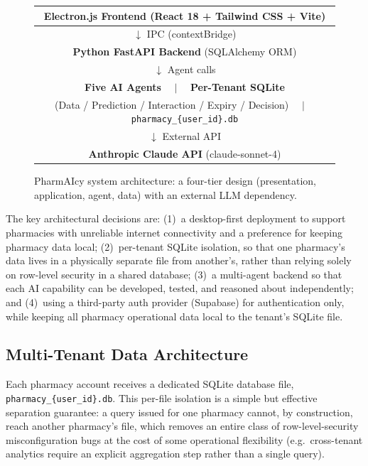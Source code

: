 \documentclass[12pt,a4paper]{article}
\begin{document}
\begin{figure}[H]
\centering
\begin{tabular}{|c|}
\hline
\textbf{Electron.js Frontend} (React 18 + Tailwind CSS + Vite) \\
\hline
$\downarrow$ IPC (contextBridge) \\
\hline
\textbf{Python FastAPI Backend} (SQLAlchemy ORM) \\
\hline
$\downarrow$ Agent calls \\
\hline
\textbf{Five AI Agents} $\quad|\quad$ \textbf{Per-Tenant SQLite} \\
(Data / Prediction / Interaction / Expiry / Decision) $\quad|\quad$ \texttt{pharmacy\_\{user\_id\}.db} \\
\hline
$\downarrow$ External API \\
\hline
\textbf{Anthropic Claude API} (claude-sonnet-4) \\
\hline
\end{tabular}
\caption{PharmAIcy system architecture: a four-tier design (presentation, application, agent, data) with an external LLM dependency.}
\label{fig:arch}
\end{figure}

The key architectural decisions are: (1)~a desktop-first deployment to support pharmacies with unreliable internet connectivity and a preference for keeping pharmacy data local; (2)~per-tenant SQLite isolation, so that one pharmacy's data lives in a physically separate file from another's, rather than relying solely on row-level security in a shared database; (3)~a multi-agent backend so that each AI capability can be developed, tested, and reasoned about independently; and (4)~using a third-party auth provider (Supabase) for authentication only, while keeping all pharmacy operational data local to the tenant's SQLite file.

\subsection{Multi-Tenant Data Architecture}

Each pharmacy account receives a dedicated SQLite database file, \texttt{pharmacy\_\{user\_id\}.db}. This per-file isolation is a simple but effective separation guarantee: a query issued for one pharmacy cannot, by construction, reach another pharmacy's file, which removes an entire class of row-level-security misconfiguration bugs at the cost of some operational flexibility (e.g.\ cross-tenant analytics require an explicit aggregation step rather than a single query).
\end{document}
